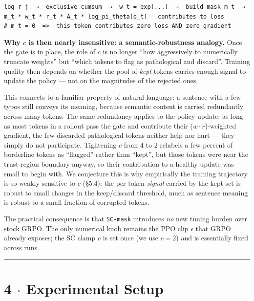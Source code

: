 \documentclass[11pt,a4paper]{article}
\theoremstyle{remark}
\begin{document}
\begin{lstlisting}
log r_j  →  exclusive cumsum  →  w_t = exp(...)  →  build mask m_t  →
m_t * w_t * r_t * A_t * log_pi_theta(o_t)   contributes to loss
# m_t = 0  =>  this token contributes zero loss AND zero gradient
\end{lstlisting}

\textbf{Why $c$ is then nearly insensitive: a semantic-robustness analogy.} Once the gate is in place, the role of $c$ is no longer ``how aggressively to numerically truncate weights'' but ``which tokens to flag as pathological and discard''. Training quality then depends on whether the pool of \emph{kept} tokens carries enough signal to update the policy --- not on the magnitudes of the rejected ones.

This connects to a familiar property of natural language: a sentence with a few typos still conveys its meaning, because semantic content is carried redundantly across many tokens. The same redundancy applies to the policy update: as long as most tokens in a rollout pass the gate and contribute their ($w\!\cdot\! r$)-weighted gradient, the few discarded pathological tokens neither help nor hurt --- they simply do not participate. Tightening $c$ from $4$ to $2$ relabels a few percent of borderline tokens as ``flagged'' rather than ``kept'', but those tokens were near the trust-region boundary anyway, so their contribution to a healthy update was small to begin with. We conjecture this is why empirically the training trajectory is so weakly sensitive to $c$ (§5.4): the per-token \emph{signal} carried by the kept set is robust to small changes in the keep/discard threshold, much as sentence meaning is robust to a small fraction of corrupted tokens.

The practical consequence is that \texttt{SC-mask} introduces \emph{no} new tuning burden over stock GRPO. The only numerical knob remains the PPO clip $\epsilon$ that GRPO already exposes; the SC clamp $c$ is set once (we use $c=2$) and is essentially fixed across runs.


\vspace{0.5em}\hrule\vspace{0.5em}
\section*{4 $\cdot$ Experimental Setup}
\end{document}
